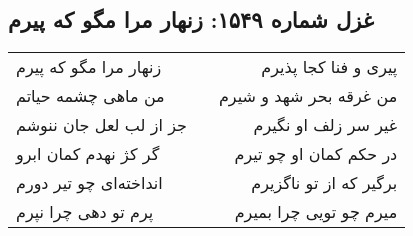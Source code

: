\begin{center}
\section*{غزل شماره ۱۵۴۹: زنهار مرا مگو که پیرم}
\label{sec:1549}
\begin{longtable}{l p{0.5cm} r}
زنهار مرا مگو که پیرم
&&
پیری و فنا کجا پذیرم
\\
من ماهی چشمه حیاتم
&&
من غرقه بحر شهد و شیرم
\\
جز از لب لعل جان ننوشم
&&
غیر سر زلف او نگیرم
\\
گر کژ نهدم کمان ابرو
&&
در حکم کمان او چو تیرم
\\
انداخته‌ای چو تیر دورم
&&
برگیر که از تو ناگزیرم
\\
پرم تو دهی چرا نپرم
&&
میرم چو تویی چرا بمیرم
\\
\end{longtable}
\end{center}
